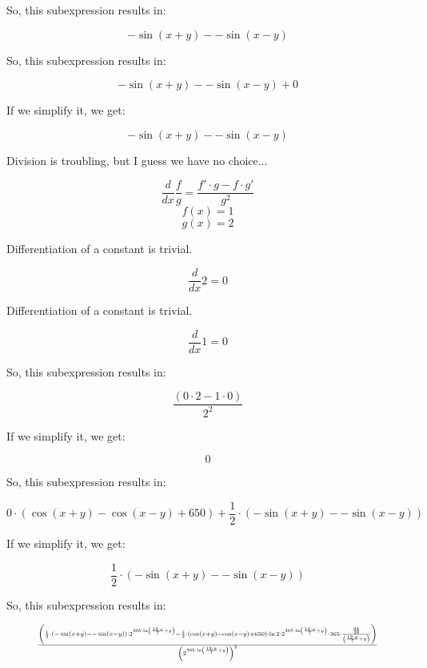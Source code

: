 \documentclass[12pt]{article}
\begin{document}
So, this subexpression results in:

$$ - \sin \left( x  +  y \right) - - \sin \left( x  -  y \right) $$

So, this subexpression results in:

$$ - \sin \left( x  +  y \right) - - \sin \left( x  -  y \right) +  0  $$

If we simplify it, we get:

$$ - \sin \left( x  +  y \right) - - \sin \left( x  -  y \right) $$

Division is troubling, but I guess we have no choice...

$$ \frac{d}{dx} \frac{f}{g} = \frac{f' \cdot g - f \cdot g'}{g^2} $$
$$ f(x) =  1  $$
$$ g(x) =  2  $$

Differentiation of a constant is trivial.

$$ \frac{d}{dx} 2 = 0 $$

Differentiation of a constant is trivial.

$$ \frac{d}{dx} 1 = 0 $$

So, this subexpression results in:

$$ \frac{\left( 0  \cdot  2  -  1  \cdot  0 \right)}{ 2 ^{ 2 }} $$

If we simplify it, we get:

$$  0  $$

So, this subexpression results in:

$$  0  \cdot \left(\cos \left( x  +  y \right) - \cos \left( x  -  y \right) +  650 \right) + \frac{ 1 }{ 2 } \cdot \left(- \sin \left( x  +  y \right) - - \sin \left( x  -  y \right)\right) $$

If we simplify it, we get:

$$ \frac{ 1 }{ 2 } \cdot \left(- \sin \left( x  +  y \right) - - \sin \left( x  -  y \right)\right) $$

So, this subexpression results in:

\begin{equation}
\resizebox{.9\hsize}{!}{ $
\frac{\left(\frac{ 1 }{ 2 } \cdot \left(- \sin \left( x  +  y \right) - - \sin \left( x  -  y \right)\right) \cdot  2 ^{ 365  \cdot \ln \left(\frac{ 12  \cdot  x }{ 7 } +  y \right)} - \frac{ 1 }{ 2 } \cdot \left(\cos \left( x  +  y \right) - \cos \left( x  -  y \right) +  650 \right) \cdot \ln  2  \cdot  2 ^{ 365  \cdot \ln \left(\frac{ 12  \cdot  x }{ 7 } +  y \right)} \cdot  365  \cdot \frac{\frac{ 84 }{ 49 }}{\left(\frac{ 12  \cdot  x }{ 7 } +  y \right)}\right)}{\left( 2 ^{ 365  \cdot \ln \left(\frac{ 12  \cdot  x }{ 7 } +  y \right)}\right)^{ 2 }}
$ }
\end{equation}
\end{document}
